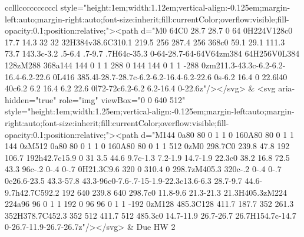 \documentclass[
]{article}
\begin{document}
\begin{figure*}
\begin{longtable*}{cclllccccccccccl}
style="height:1em;width:1.12em;vertical-align:-0.125em;margin-left:auto;margin-right:auto;font-size:inherit;fill:currentColor;overflow:visible;fill-opacity:0.1;position:relative;"><path d="M0 64C0 28.7 28.7 0 64 0H224V128c0 17.7 14.3 32 32 32H384v38.6C310.1 219.5 256 287.4 256 368c0 59.1 29.1 111.3 73.7 143.3c-3.2 .5-6.4 .7-9.7 .7H64c-35.3 0-64-28.7-64-64V64zm384 64H256V0L384 128zM288 368a144 144 0 1 1 288 0 144 144 0 1 1 -288 0zm211.3-43.3c-6.2-6.2-16.4-6.2-22.6 0L416 385.4l-28.7-28.7c-6.2-6.2-16.4-6.2-22.6 0s-6.2 16.4 0 22.6l40 40c6.2 6.2 16.4 6.2 22.6 0l72-72c6.2-6.2 6.2-16.4 0-22.6z"/></svg> & <svg aria-hidden="true" role="img" viewBox="0 0 640 512" style="height:1em;width:1.25em;vertical-align:-0.125em;margin-left:auto;margin-right:auto;font-size:inherit;fill:currentColor;overflow:visible;fill-opacity:0.1;position:relative;"><path d="M144 0a80 80 0 1 1 0 160A80 80 0 1 1 144 0zM512 0a80 80 0 1 1 0 160A80 80 0 1 1 512 0zM0 298.7C0 239.8 47.8 192 106.7 192h42.7c15.9 0 31 3.5 44.6 9.7c-1.3 7.2-1.9 14.7-1.9 22.3c0 38.2 16.8 72.5 43.3 96c-.2 0-.4 0-.7 0H21.3C9.6 320 0 310.4 0 298.7zM405.3 320c-.2 0-.4 0-.7 0c26.6-23.5 43.3-57.8 43.3-96c0-7.6-.7-15-1.9-22.3c13.6-6.3 28.7-9.7 44.6-9.7h42.7C592.2 192 640 239.8 640 298.7c0 11.8-9.6 21.3-21.3 21.3H405.3zM224 224a96 96 0 1 1 192 0 96 96 0 1 1 -192 0zM128 485.3C128 411.7 187.7 352 261.3 352H378.7C452.3 352 512 411.7 512 485.3c0 14.7-11.9 26.7-26.7 26.7H154.7c-14.7 0-26.7-11.9-26.7-26.7z"/></svg> & Due HW 2 \\ 

\end{longtable*}
\end{figure*}
\end{document}
